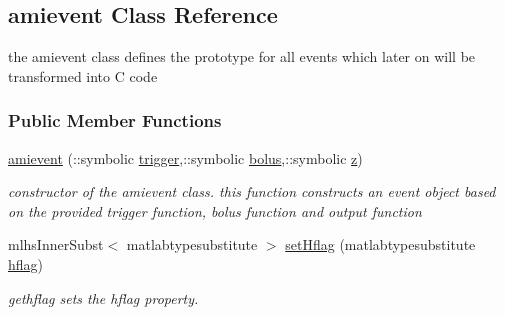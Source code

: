 \hypertarget{classamievent}{}\subsection{amievent Class Reference}
\label{classamievent}


the amievent class defines the prototype for all events which later on will be transformed into C code  


\subsubsection*{Public Member Functions}
\begin{DoxyCompactItemize}
\item 
\hyperlink{classamievent_aa89b0efd53c33a18acf04c1dda76842c}{amievent} (\+::symbolic \hyperlink{classamievent_ae194cb817eae4085f8023885100c68dd}{trigger},\+::symbolic \hyperlink{classamievent_ab9227561ac246ee4b70f9e65c25ffda7}{bolus},\+::symbolic \hyperlink{classamievent_a25ed1bcb423b0b7200f485fc5ff71c8e}{z})
\begin{DoxyCompactList}\small\item\em constructor of the amievent class. this function constructs an event object based on the provided trigger function, bolus function and output function \end{DoxyCompactList}\item 
mlhs\+Inner\+Subst$<$ matlabtypesubstitute $>$ \hyperlink{classamievent_ac3b640fb9f5aa45290aab37bec8d070f}{set\+Hflag} (matlabtypesubstitute \hyperlink{classamievent_ab98347b5ce6fbe7bd007030346b88575}{hflag})
\begin{DoxyCompactList}\small\item\em gethflag sets the hflag property. \end{DoxyCompactList}\end{DoxyCompactItemize}
